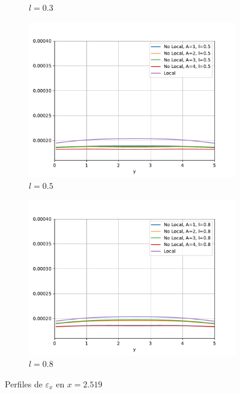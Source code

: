 \begin{figure}
\begin{subfigure}{0.48\textwidth}
		        \caption{$l=0.3$}
		        \label{fig:perfilesX0259.03}
		    \end{subfigure}
		    \quad
		    \begin{subfigure}{0.48\textwidth}
		    \centering
		        \includegraphics[width=\textwidth]{figuras/Placa/Perfiles/X/X0.5_2.519.pdf}
		        \caption{$l=0.5$}
		        \label{fig:perfilesX0259.05}
		    \end{subfigure}
		    \begin{subfigure}{0.48\textwidth}
		    \centering
		        \includegraphics[width=\textwidth]{figuras/Placa/Perfiles/X/X0.8_2.519.pdf}
		        \caption{$l=0.8$}
		        \label{fig:perfilesX0259.08}
		    \end{subfigure}
		    \caption{Perfiles de $\varepsilon_x$ en $x=2.519$}
		    \label{fig:perfilesX0259}
		\end{figure}
